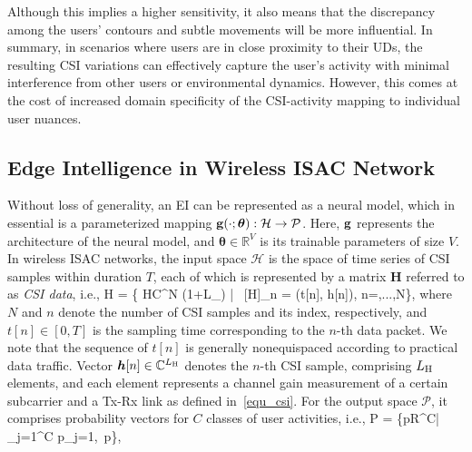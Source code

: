 

Although this implies a higher sensitivity, it also means that the discrepancy among the users' contours and subtle movements will be more influential.
In summary, in scenarios where users are in close proximity to their UDs, the resulting CSI variations can effectively capture the user's activity with minimal interference from other users or environmental dynamics. 
However, this comes at the cost of increased domain specificity of the CSI-activity mapping to individual user nuances.





\subsection{Edge Intelligence in Wireless ISAC Network}\label{s2ec_protocol}

Without loss of generality, an EI can be represented as a neural model, which in essential is a parameterized mapping $\mathbf{g}(\cdot ; \bm \theta): \mathcal H \rightarrow \mathcal P$.
Here, $\mathbf{g}$ represents the architecture of the neural model, and $\bm\theta\in\mathbb R^{V}$ is its trainable parameters of size $V$. 
In wireless ISAC networks, the input space $\mathcal H$ is the space of time series of CSI samples within duration $T$, each of which is represented by a matrix $\bm H$ referred to as \emph{CSI data}, i.e.,
\beq
\label{equ_csi_data}
\mathcal H \!=\! \{ \bm H\!\in\!\mathbb C^{N\!\times\! (1+L_{\rH})} | ~[\bm H]_{n} \!=\! (t[n], \bm h[n]), n\!=,...,N\!\}, 
\eeq
where $N$ and $n$ denote the number of CSI samples and its index, respectively, 
and $t[n]\in [0,T]$ is the sampling time corresponding to the $n$-th data packet.
We note that the sequence of $t[n]$ is generally nonequispaced according to practical data traffic.
Vector $\bm h[n]\in\mathbb C^{L_{\mathrm{H}}}$ denotes the $n$-th CSI sample, comprising $L_{\mathrm{H}}$ elements, and each element represents a channel gain measurement of a certain subcarrier and a Tx-Rx link as defined in~\eqref{equ_csi}.
For the output space $\mathcal P$, it comprises probability vectors for $C$ classes of user activities, i.e.,
\beq
\label{eq_cP}
\mathcal P = \{\bm p\in \mathbb R^C| \sum_{j=1}^C p_j=1,~\preceq\bm p\preceq{}\},
\eeq
{}

